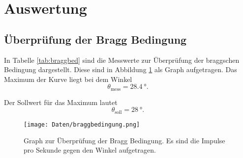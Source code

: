\section{Auswertung}
\label{sec:Auswertung}

\subsection{Überprüfung der Bragg Bedingung}

In Tabelle \ref{tab:braggbed} sind die Messwerte zur Überprüfung der braggschen
Bedingung dargestellt. Diese sind in Abbildung \ref{fig:braggbed} als Graph
aufgetragen.
Das Maximum der Kurve liegt bei dem Winkel
\begin{equation}
  \theta_\text{mess} = \SI{28.4}{\degree}.
\end{equation}

Der Sollwert für das Maximum lautet
\begin{equation}
  \theta_\text{soll} = \SI{28}{\degree}.
\end{equation}

\begin{figure}
  \centering
  \texttt{[image: Daten/braggbedingung.png]}
  \caption{Graph zur Überprüfung der Bragg Bedingung. Es sind die Impulse pro
  Sekunde gegen den Winkel aufgetragen.}
  \label{fig:braggbed}
\end{figure}

